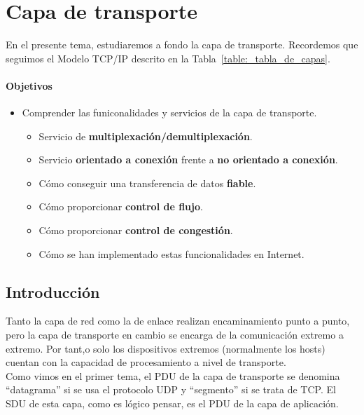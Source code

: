 \chapter{Capa de transporte}

En el presente tema, estudiaremos a fondo la capa de transporte. Recordemos que seguimos el Modelo TCP/IP descrito en la Tabla~\ref{table:_tabla_de_capas}.

\subsubsection{Objetivos}
\begin{itemize}
    \item Comprender las funiconalidades y servicios de la capa de transporte.
        \begin{itemize}
            \item Servicio de \textbf{multiplexación/demultiplexación}.
            \item Servicio \textbf{orientado a conexión} frente a \textbf{no orientado a conexión}.
            \item Cómo conseguir una transferencia de datos \textbf{fiable}.
            \item Cómo proporcionar \textbf{control de flujo}.
            \item Cómo proporcionar \textbf{control de congestión}.
            \item Cómo se han implementado estas funcionalidades en Internet.
        \end{itemize}
\end{itemize}

\section{Introducción}

Tanto la capa de red como la de enlace realizan encaminamiento punto a punto, pero la capa de transporte en cambio se encarga de la comunicación extremo a extremo. Por tant,o solo los dispositivos extremos (normalmente los hosts) cuentan con la capacidad de procesamiento a nivel de transporte. \\

Como vimos en el primer tema, el \acrshort{PDU} de la capa de transporte se denomina ``datagrama'' si se usa el protocolo \acrshort{UDP} y ``segmento'' si se trata de \acrshort{TCP}. El \acrshort{SDU} de esta capa, como es lógico pensar, es el \acrshort{PDU} de la capa de aplicación.


